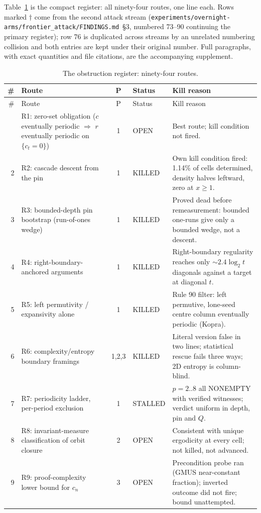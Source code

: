 \documentclass[11pt]{article}
\theoremstyle{definition}
\begin{document}
Table~\ref{tab:register} is the compact register: all ninety-four routes, one
line each. Rows marked $\dagger$ come from the second attack stream
(\texttt{experiments/overnight-arms/frontier\_attack/FINDINGS.md}~\S3, numbered
73--90 continuing the primary register); row 76 is duplicated across streams by
an unrelated numbering collision and both entries are kept under their original
number. Full paragraphs, with exact quantities and file citations, are the
accompanying supplement.

{\footnotesize
\begin{longtable}{@{}r p{4.0cm} c p{1.7cm} p{6.1cm}@{}}
\caption{The obstruction register: ninety-four routes.}\label{tab:register}\\
\toprule
\# & Route & P & Status & Kill reason \\
\midrule
\endfirsthead
\toprule
\# & Route & P & Status & Kill reason \\
\midrule
\endhead
\bottomrule
\endfoot
1 & R1: zero-set obligation ($c$ eventually periodic $\Rightarrow$ $r$ eventually periodic on $\{c_t=0\}$) & 1 & OPEN & Best route; kill condition not fired. \\
2 & R2: cascade descent from the pin & 1 & KILLED & Own kill condition fired: 1.14\% of cells determined, density halves leftward, zero at $x\ge1$. \\
3 & R3: bounded-depth pin bootstrap (run-of-ones wedge) & 1 & KILLED & Proved dead before remeasurement: bounded one-runs give only a bounded wedge, not a descent. \\
4 & R4: right-boundary-anchored arguments & 1 & KILLED & Right-boundary regularity reaches only $\sim2.4\log_2 t$ diagonals against a target at diagonal $t$. \\
5 & R5: left permutivity / expansivity alone & 1 & KILLED & Rule 90 filter: left permutive, lone-seed centre column eventually periodic (Kopra). \\
6 & R6: complexity/entropy boundary framings & 1,2,3 & KILLED & Literal version false in two lines; statistical rescue fails three ways; 2D entropy is column-blind. \\
7 & R7: periodicity ladder, per-period exclusion & 1 & STALLED & $p=2..8$ all NONEMPTY with verified witnesses; verdict uniform in depth, pin and $Q$. \\
8 & R8: invariant-measure classification of orbit closure & 2 & OPEN & Consistent with unique ergodicity at every cell; not killed, not advanced. \\
9 & R9: proof-complexity lower bound for $c_n$ & 3 & OPEN & Precondition probe ran (GMUS near-constant fraction); inverted outcome did not fire; bound unattempted. \\

\end{longtable}}
\end{document}

